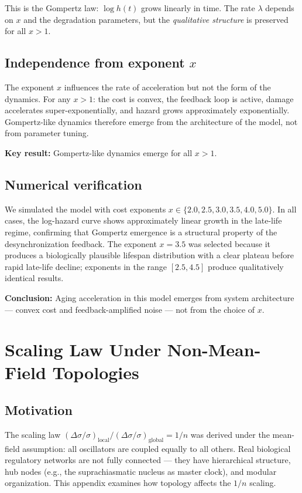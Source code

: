 \documentclass[12pt]{article}
\begin{document}
This is the Gompertz law: $\log h(t)$ grows linearly in time. The rate $\lambda$
depends on $x$ and the degradation parameters, but the \emph{qualitative
structure} is preserved for all $x > 1$.

\subsection{Independence from exponent $x$}

The exponent $x$ influences the rate of acceleration but not the form of the
dynamics. For any $x > 1$: the cost is convex, the feedback loop is active,
damage accelerates super-exponentially, and hazard grows approximately
exponentially. Gompertz-like dynamics therefore emerge from the architecture of
the model, not from parameter tuning.

\textbf{Key result:} Gompertz-like dynamics emerge for all $x > 1$.

\subsection{Numerical verification}

We simulated the model with cost exponents $x \in \{2.0, 2.5, 3.0, 3.5, 4.0,
5.0\}$. In all cases, the log-hazard curve shows approximately linear growth in
the late-life regime, confirming that Gompertz emergence is a structural
property of the desynchronization feedback. The exponent $x = 3.5$ was selected
because it produces a biologically plausible lifespan distribution with a clear
plateau before rapid late-life decline; exponents in the range $[2.5, 4.5]$
produce qualitatively identical results.

\textbf{Conclusion:} Aging acceleration in this model emerges from system
architecture — convex cost and feedback-amplified noise — not from the choice
of $x$.

\section{Scaling Law Under Non-Mean-Field Topologies}
\label{app:topology}

\subsection{Motivation}

The scaling law $(\Delta\sigma/\sigma)_\text{local}/(\Delta\sigma/\sigma)_\text{global} = 1/n$
was derived under the mean-field assumption: all oscillators are coupled
equally to all others. Real biological regulatory networks are not fully
connected — they have hierarchical structure, hub nodes (e.g., the
suprachiasmatic nucleus as master clock), and modular organization. This
appendix examines how topology affects the $1/n$ scaling.
\end{document}
